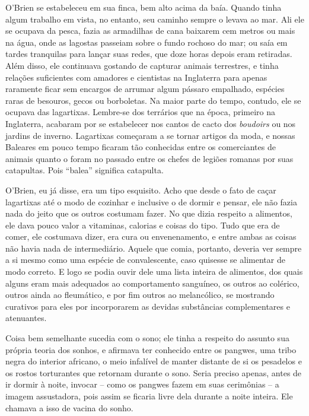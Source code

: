 O'Brien se estabeleceu em sua finca, bem alto acima da baía. Quando
tinha algum trabalho em vista, no entanto, seu caminho sempre o levava
ao mar. Ali ele se ocupava da pesca, fazia as armadilhas de cana
baixarem cem metros ou mais na água, onde as lagostas passeiam sobre o
fundo rochoso do mar; ou saía em tardes tranquilas para lançar suas
redes, que doze horas depois eram retiradas. Além disso, ele continuava
gostando de capturar animais terrestres, e tinha relações suficientes
com amadores e cientistas na Inglaterra para apenas raramente ficar sem
encargos de arrumar algum pássaro empalhado, espécies raras de besouros,
gecos ou borboletas. Na maior parte do tempo, contudo, ele se ocupava
das lagartixas. Lembre-se dos terrários que na época, primeiro na
Inglaterra, acabaram por se estabelecer nos cantos de cacto dos
\emph{boudoirs} ou nos jardins de inverno. Lagartixas começaram a se
tornar artigos da moda, e nossas Baleares em pouco tempo ficaram tão
conhecidas entre os comerciantes de animais quanto o foram no passado
entre os chefes de legiões romanas por suas catapultas. Pois ``balea''
significa catapulta.

O'Brien, eu já disse, era um tipo esquisito. Acho que desde o fato de
caçar lagartixas até o modo de cozinhar e inclusive o de dormir e
pensar, ele não fazia nada do jeito que os outros costumam fazer. No que
dizia respeito a alimentos, ele dava pouco valor a vitaminas, calorias e
coisas do tipo. Tudo que era de comer, ele costumava dizer, era cura ou
envenenamento, e entre ambas as coisas não havia nada de intermediário.
Aquele que comia, portanto, deveria ver sempre a si mesmo como uma
espécie de convalescente, caso quisesse se alimentar de modo correto. E
logo se podia ouvir dele uma lista inteira de alimentos, dos quais
alguns eram mais adequados ao comportamento sanguíneo, os outros ao
colérico, outros ainda ao fleumático, e por fim outros ao melancólico,
se mostrando curativos para eles por incorporarem as devidas substâncias
complementares e atenuantes.

Coisa bem semelhante sucedia com o sono; ele tinha a respeito do assunto
sua própria teoria dos sonhos, e afirmava ter conhecido entre os
pangwes, uma tribo negra do interior africano, o meio infalível de
manter distante de si os pesadelos e os rostos torturantes que retornam
durante o sono. Seria preciso apenas, antes de ir dormir à noite,
invocar -- como os pangwes fazem em suas cerimônias -- a imagem
assustadora, pois assim se ficaria livre dela durante a noite inteira.
Ele chamava a isso de vacina do sonho.

